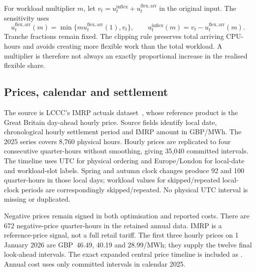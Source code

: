 For workload multiplier $m$, let $v_t=u_t^{\mathrm{inflex}}+u_t^{\mathrm{flex,arr}}$ in the original input. The sensitivity uses
\begin{equation}
u_t^{\mathrm{flex,arr}}(m)=\min\{m u_t^{\mathrm{flex,arr}}(1),v_t\},
\qquad u_t^{\mathrm{inflex}}(m)=v_t-u_t^{\mathrm{flex,arr}}(m).
\end{equation}
Tranche fractions remain fixed. The clipping rule preserves total arriving CPU-hours and avoids creating more flexible work than the total workload. A multiplier is therefore not always an exactly proportional increase in the realised flexible share.



\subsection{Prices, calendar and settlement}
The source is LCCC's IMRP actuals dataset~\cite{lccc_imrp_actuals}, whose reference product is the Great Britain day-ahead hourly price. Source fields identify local date, chronological hourly settlement period and IMRP amount in GBP/MWh. The 2025 series covers 8,760 physical hours. Hourly prices are replicated to four consecutive quarter-hours without smoothing, giving 35,040 committed intervals. The timeline uses UTC for physical ordering and Europe/London for local-date and workload-slot labels. Spring and autumn clock changes produce 92 and 100 quarter-hours in those local days; workload values for skipped/repeated local-clock periods are correspondingly skipped/repeated. No physical UTC interval is missing or duplicated.

Negative prices remain signed in both optimisation and reported costs. There are 672 negative-price quarter-hours in the retained annual data. IMRP is a reference-price signal, not a full retail tariff. The first three hourly prices on 1 January 2026 are GBP~46.49, 40.19 and 28.99/MWh; they supply the twelve final look-ahead intervals. The exact expanded central price timeline is included as . Annual cost uses only committed intervals in calendar 2025.
